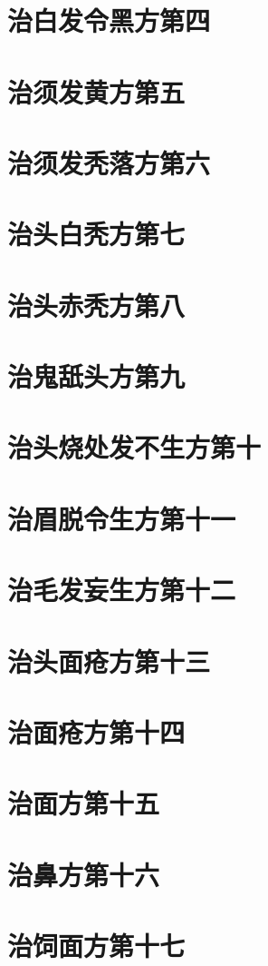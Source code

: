 \documentclass[a4paper,12pt,UTF8,twoside]{ctexbook}
\begin{document}
\chapter{治白发令黑方第四}
\chapter{治须发黄方第五}
\chapter{治须发秃落方第六}
\chapter{治头白秃方第七}
\chapter{治头赤秃方第八}
\chapter{治鬼舐头方第九}
\chapter{治头烧处发不生方第十}
\chapter{治眉脱令生方第十一}
\chapter{治毛发妄生方第十二}
\chapter{治头面疮方第十三}
\chapter{治面疮方第十四}
\chapter{治面方第十五}
\chapter{治鼻方第十六}
\chapter{治饲面方第十七}
\end{document}
